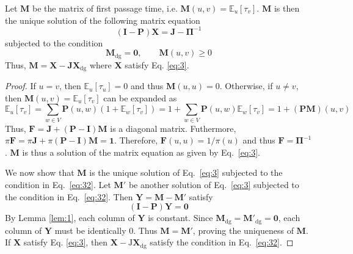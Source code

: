 \begin{proposition}
  \label{prop:4}
  Let $\bm{M}$ be the matrix of first passage time, i.e. $\bm{M}(u,v)
  = \mathbb{E}_{u}[\tau_v]$. $\bm{M}$ is then the unique solution of the
  following matrix equation
  \begin{equation}
    \label{eq:3}
   (\bm{I} - \bm{P})\bm{X} = \bm{J} - \bm{\Pi}^{-1}
  \end{equation}
  subjected to the condition 
  \begin{equation}
    \label{eq:32}
 \bm{M}_{\mathrm{dg}} = \bm{0}, \qquad \bm{M}(u,v) \geq 0   
  \end{equation}
  Thus, $\bm{M} = \bm{X} - \bm{J}\bm{X}_{\mathrm{dg}}$ where $\bm{X}$ satisfy Eq. \eqref{eq:3}.
\end{proposition}
\begin{proof}
  If $u = v$, then $\mathbb{E}_{u}[\tau_u] = 0$ and thus $\bm{M}(u,u)
  = 0$. Otherwise, if $u \not = v$, then $\bm{M}(u,v) = \mathbb{E}_{u}[\tau_v]$ can be
  expanded as
  \begin{equation}
    \label{eq:4}
    \mathbb{E}_{u}[\tau_v] = \sum_{w \in V}{\bm{P}(u,w)(1 +
      \mathbb{E}_{w}[\tau_v])} = 1 + \sum_{w \in V}{\bm{P}(u,w)
      \mathbb{E}_{w}[\tau_v]} = 1 + (\bm{PM})(u,v)
  \end{equation}
  Thus, $\bm{F} = \bm{J} + (\bm{P} - \bm{I})\bm{M}$ is a diagonal
  matrix. Futhermore, $\pi \bm{F} = \pi \bm{J} + \pi(\bm{P} -
  \bm{I})\bm{M} = \bm{1}$. Therefore, $\bm{F}(u,u) = 1/\pi(u)$ and
  thus $\bm{F} = \bm{\Pi}^{-1}$. $\bm{M}$ is thus a solution of the
  matrix equation as given by Eq.~\eqref{eq:3}.

  We now show that $\bm{M}$ is the unique solution of Eq.~\eqref{eq:3}
  subjected to the condition in Eq.~\eqref{eq:32}. Let $\bm{M}'$ be another solution of Eq.~\eqref{eq:3} subjected to the
  condition in Eq.~\eqref{eq:32}. Then $\bm{Y} = \bm{M} -
  \bm{M}'$ satisfy
  \begin{equation}
    \label{eq:19}
    (\bm{I} - \bm{P})\bm{Y} = \bm{0}
  \end{equation}
  By Lemma \ref{lem:1}, each column of $\bm{Y}$ is constant. Since
  $\bm{M}_{\mathrm{dg}} = \bm{M'}_{\mathrm{dg}} = \bm{0}$, each
  column of $\bm{Y}$ must be identically $0$. Thus $\bm{M} = \bm{M'}$,
  proving the uniqueness of $\bm{M}$. If $\bm{X}$ satisfy
  Eq. \eqref{eq:3}, then $\bm{X} - \mathrm{J}\bm{X}_{\mathrm{dg}}$
  satisfy the condition in Eq.~\eqref{eq:32}.
\end{proof}

